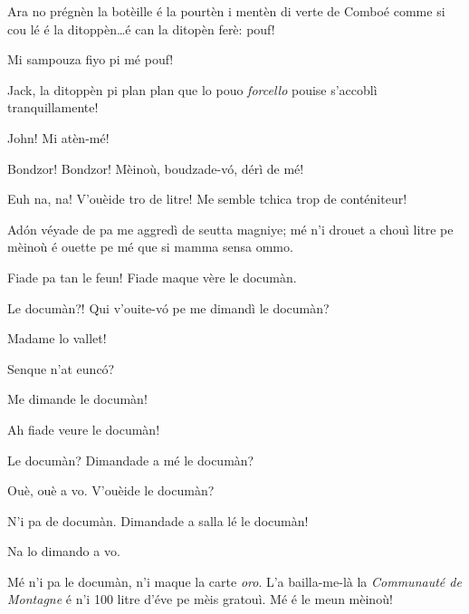 \begin{drama}
\Jackspeaks Ara no prégnèn la botèille é la pourtèn i mentèn di verte de Comboé comme si cou lé é la ditoppèn\ldots é can la ditopèn ferè: pouf!

\Prosperospeaks Mi sampouza fiyo pi mé pouf!

\Johnspeaks Jack, la ditoppèn pi plan plan que lo pouo \textit{forcello} pouise s'accoblì tranquillamente! 


\Jackspeaks John! Mi atèn-mé!


\scene[-- 1000 litre!]


\Naimaspeaks{} Bondzor!  Bondzor! Mèinoù, boudzade-v\'o, dérì de mé!

\Prosperospeaks Euh na, na! V'ouèide tro de litre! Me semble tchica trop de conténiteur!

\Naimaspeaks Ad\'on véyade de pa me aggredì de seutta magniye; mé n'i drouet a chouì litre pe mèinoù é ouette pe mé que si mamma sensa ommo.

\Prosperospeaks Fiade pa tan le feun! Fiade maque vère le documàn.

\Naimaspeaks Le documàn?! Qui v'ouite-v\'o pe me dimandì le documàn? 

\Prosperospeaks Madame lo vallet!


\Valletspeaks Senque n'at eunc\'o?

\Naimaspeaks Me dimande le documàn!

\Valletspeaks Ah fiade veure le documàn!

\Naimaspeaks Le documàn? Dimandade a mé le documàn?

\Valletspeaks Ouè, ouè a vo. V'ouèide le documàn?

\Naimaspeaks N'i pa de documàn. Dimandade a salla lé  le documàn!

\Valletspeaks Na lo dimando a vo.

\Naimaspeaks Mé n'i pa le documàn, n'i maque la carte \textit{oro}.  L'a bailla-me-là la \textit{Communauté de Montagne} é n'i 100 litre d'éve pe mèis gratouì. Mé é le meun mèinoù!


\end{drama}

